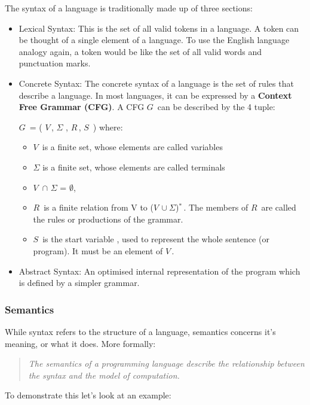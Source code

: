 \documentclass[ %
                    author={Jonathan Rankin},
                supervisor={Dr. David May, Dr. Ian Holyer},
                    degree={MEng},
                     title={CodeTouch},
                  subtitle={A Revolutionary Way To Program Real Code On Touch Screen Devices},
                      type={enterprise},
                      year={2015 } ]{dissertation}
\begin{document}
The syntax of a language is traditionally made up of three sections:
\begin{itemize}
\item {Lexical Syntax: }
This is the set of all valid tokens in a language. A token can be thought of a single element of a language. To use the English language analogy again, a token would be like the set of all valid words and punctuation marks. 

\item{Concrete Syntax: }
The concrete syntax of a language is the set of rules that describe a language. In most languages, it can be expressed by a \textbf{Context Free Grammar (CFG)}. A CFG $G\,$ can be described by the 4 tuple\cite{Sipser}:

$G\,$ = ( $V\,$, $\Sigma$ , $R\,$, $S\,$ ) where:

\begin{itemize}
\item
$V\,$  is a finite set, whose elements are called variables
\item
$\Sigma$ is a finite set, whose elements are called terminals
\item $V\,$ $\cap$ $\Sigma$ = $\emptyset$,
\item
$R\,$ is a finite relation from V to ($V\,\cup\Sigma$)$^{*}\,$. The members of $R\,$ are called the rules or productions of the grammar. 
\item
$S\,$ is the start variable , used to represent the whole sentence (or program). It must be an element of $V\,$.
\end{itemize}



\item{Abstract Syntax: }
An optimised internal representation of the program which is defined by a simpler grammar. 
\end{itemize}


\subsubsection{Semantics}
While syntax refers to the structure of a language, semantics concerns it's meaning, or what it does. More formally: 

\begin{quote}
\textit{The semantics of a programming language describe the relationship between the syntax and the model of computation\cite{semantics}.}
\end{quote}

To demonstrate this let's look at an example: 
\end{document}
